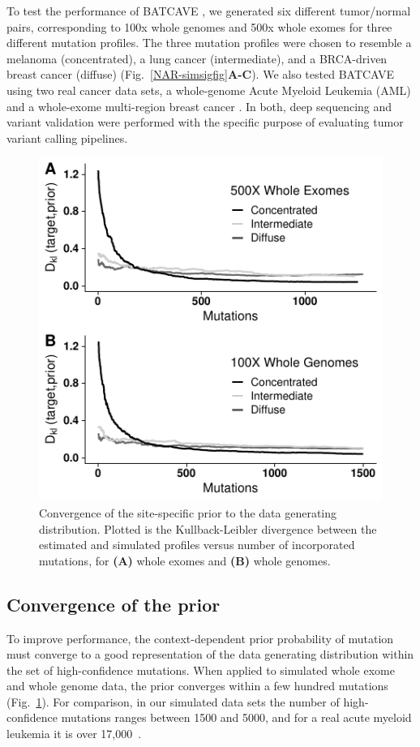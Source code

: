 \documentclass[a4,center,fleqn]{NAR}
\newcommand{\batcave}{BATCAVE }
\begin{document}
To test the performance of \batcave, we generated six different tumor/normal pairs, corresponding to 100x whole genomes and 500x whole exomes for three different mutation profiles.
The three mutation profiles were chosen to resemble a melanoma (concentrated), a lung cancer (intermediate), and a BRCA-driven breast cancer (diffuse) (Fig.~\ref{NAR-simsigfig}\textbf{A-C}).
We also tested \batcave using two real cancer data sets, a whole-genome Acute Myeloid Leukemia (AML) \citep{Griffith2015} and a whole-exome multi-region breast cancer \cite{Shi2018}.
In both, deep sequencing and variant validation were performed with the specific purpose of evaluating tumor variant calling pipelines.

\begin{figure}
  \begin{center}
  \includegraphics{figures/kl_only.pdf}
  \end{center}
  \caption{Convergence of the site-specific prior to the data generating distribution. Plotted is the Kullback-Leibler divergence between the estimated and simulated profiles versus number of incorporated mutations, for \textbf{(A)} whole exomes and \textbf{(B)} whole genomes.
  }
\label{NAR-kl_fig}
\end{figure}

\subsection{Convergence of the prior}
To improve performance, the context-dependent prior probability of mutation must converge to a good representation of the data generating distribution within the set of high-confidence mutations.
When applied to simulated whole exome and whole genome data, the prior converges within a few hundred mutations (Fig.~\ref{NAR-kl_fig}).
For comparison, in our simulated data sets the number of high-confidence mutations ranges between 1500 and 5000, and for a real acute myeloid leukemia it is over 17,000~\cite{Griffith2015}.
\end{document}
